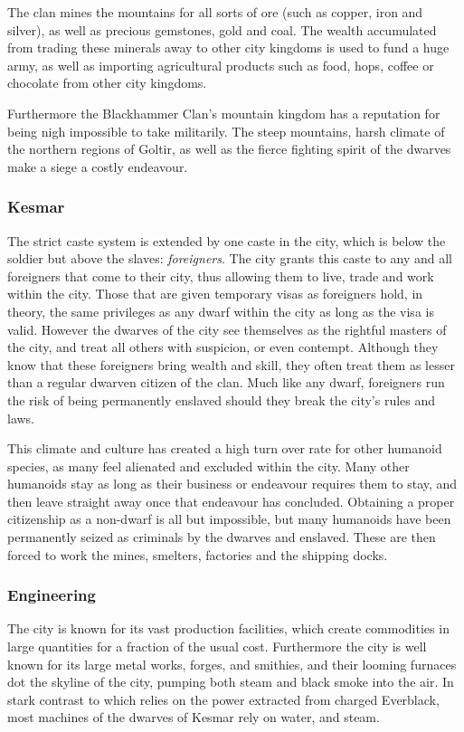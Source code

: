 The clan mines the mountains for all sorts of ore (such as copper, iron and
silver), as well as precious gemstones, gold and coal. The wealth accumulated
from trading these minerals away to other city kingdoms is used to fund a huge
army, as well as importing agricultural products such as food, hops, coffee or
chocolate from other city kingdoms.

Furthermore the Blackhammer Clan's mountain kingdom has a reputation for being
nigh impossible to take militarily. The steep mountains, harsh climate of the
northern regions of Goltir, as well as the fierce fighting spirit of the dwarves
make a siege a costly endeavour.

\subsubsection{Kesmar}

The strict caste system is extended by one caste in the city, which is below
the soldier but above the slaves: \emph{foreigners}. The city grants this
caste to any and all foreigners that come to their city, thus allowing them to
live, trade and work within the city. Those that are given temporary visas as
foreigners hold, in theory, the same privileges as any dwarf within the city
as long as the visa is valid. However the dwarves of the city see themselves
as the rightful masters of the city, and treat all others with suspicion, or
even contempt. Although they know that these foreigners bring wealth and skill,
they often treat them as lesser than a regular dwarven citizen of the clan.
Much like any dwarf, foreigners run the risk of being permanently enslaved
should they break the city's rules and laws.

This climate and culture has created a high turn over rate for other humanoid
species, as many feel alienated and excluded within the city. Many other
humanoids stay as long as their business or endeavour requires them to stay,
and then leave straight away once that endeavour has concluded. Obtaining a
proper citizenship as a non-dwarf is all but impossible, but many humanoids
have been permanently seized as criminals by the dwarves and enslaved. These
are then forced to work the mines, smelters, factories and the shipping docks.

\subsubsection{Engineering}

The city is known for its vast production facilities, which create commodities
in large quantities for a fraction of the usual cost. Furthermore the city is
well known for its large metal works, forges, and smithies, and their looming
furnaces dot the skyline of the city, pumping both steam and black smoke into
the air. In stark contrast to  which relies on the power
extracted from charged Everblack, most machines of the dwarves of Kesmar rely
on water, and steam.

